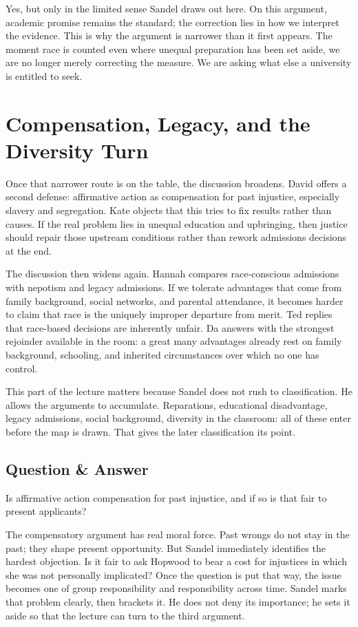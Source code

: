 Yes, but only in the limited sense Sandel draws out here. On this argument, academic promise remains the standard; the correction lies in how we interpret the evidence. This is why the argument is narrower than it first appears. The moment race is counted even where unequal preparation has been set aside, we are no longer merely correcting the measure. We are asking what else a university is entitled to seek.

\section{Compensation, Legacy, and the Diversity Turn}

Once that narrower route is on the table, the discussion broadens. David offers a second defense: affirmative action as compensation for past injustice, especially slavery and segregation. Kate objects that this tries to fix results rather than causes. If the real problem lies in unequal education and upbringing, then justice should repair those upstream conditions rather than rework admissions decisions at the end.

The discussion then widens again. Hannah compares race-conscious admissions with nepotism and legacy admissions. If we tolerate advantages that come from family background, social networks, and parental attendance, it becomes harder to claim that race is the uniquely improper departure from merit. Ted replies that race-based decisions are inherently unfair. Da answers with the strongest rejoinder available in the room: a great many advantages already rest on family background, schooling, and inherited circumstances over which no one has control.

This part of the lecture matters because Sandel does not rush to classification. He allows the arguments to accumulate. Reparations, educational disadvantage, legacy admissions, social background, diversity in the classroom: all of these enter before the map is drawn. That gives the later classification its point.

\subsection{Question \& Answer}

Is affirmative action compensation for past injustice, and if so is that fair to present applicants?

The compensatory argument has real moral force. Past wrongs do not stay in the past; they shape present opportunity. But Sandel immediately identifies the hardest objection. Is it fair to ask Hopwood to bear a cost for injustices in which she was not personally implicated? Once the question is put that way, the issue becomes one of group responsibility and responsibility across time. Sandel marks that problem clearly, then brackets it. He does not deny its importance; he sets it aside so that the lecture can turn to the third argument.

